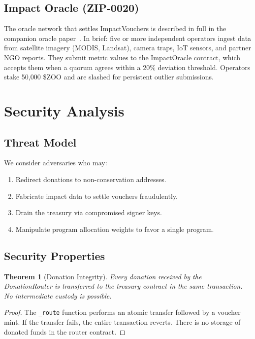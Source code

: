 \documentclass[11pt,letterpaper]{article}
\newtheorem{theorem}{Theorem}[section]
\begin{document}
\subsection{Impact Oracle (ZIP-0020)}

The oracle network that settles ImpactVouchers is described in full in the companion oracle paper~\cite{zoofundoracle2025}. In brief: five or more independent operators ingest data from satellite imagery (MODIS, Landsat), camera traps, IoT sensors, and partner NGO reports. They submit metric values to the ImpactOracle contract, which accepts them when a quorum agrees within a 20\% deviation threshold. Operators stake 50{,}000 \$ZOO and are slashed for persistent outlier submissions.

\section{Security Analysis}

\subsection{Threat Model}

We consider adversaries who may:
\begin{enumerate}
    \item Redirect donations to non-conservation addresses.
    \item Fabricate impact data to settle vouchers fraudulently.
    \item Drain the treasury via compromised signer keys.
    \item Manipulate program allocation weights to favor a single program.
\end{enumerate}

\subsection{Security Properties}

\begin{theorem}[Donation Integrity]
Every donation received by the DonationRouter is transferred to the treasury contract in the same transaction. No intermediate custody is possible.
\end{theorem}

\begin{proof}
The \texttt{\_route} function performs an atomic transfer followed by a voucher mint. If the transfer fails, the entire transaction reverts. There is no storage of donated funds in the router contract.
\end{proof}
\end{document}
